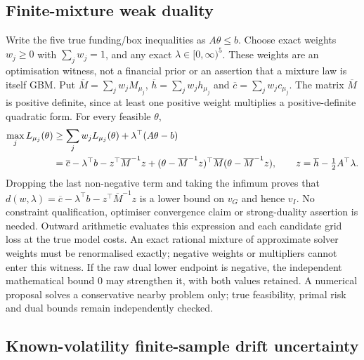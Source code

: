\documentclass[11pt]{article}
\begin{document}
\subsection{Finite-mixture weak duality}

Write the five true funding/box inequalities as $A\theta\leq b$.
Choose exact weights $w_j\geq0$ with $\sum_jw_j=1$, and any exact
$\lambda\in[0,\infty)^5$. These weights are an optimisation witness,
not a financial prior or an assertion that a mixture law is itself GBM.
Put $\overline M=\sum_jw_jM_{\mu_j}$,
$\overline h=\sum_jw_jh_{\mu_j}$ and
$\overline c=\sum_jw_jc_{\mu_j}$. The matrix $\overline M$ is positive
definite, since at least one positive weight multiplies a positive-definite
quadratic form. For every feasible $\theta$,
\begin{align}
 \max_jL_{\mu_j}(\theta)
 &\geq\sum_jw_jL_{\mu_j}(\theta)
      +\lambda^\top(A\theta-b)\notag\\
 &=\overline c-\lambda^\top b
   -z^\top\overline M^{-1}z
   +(\theta-\overline M^{-1}z)^\top
      \overline M(\theta-\overline M^{-1}z),\qquad
 z=\overline h-\tfrac12A^\top\lambda.
 \label{eq:h-drift-mixture-dual}
\end{align}
Dropping the last non-negative term and taking the infimum proves that
$d(w,\lambda)=\overline c-\lambda^\top b-z^\top\overline M^{-1}z$
is a lower bound on $v_G$ and hence $v_I$. No constraint qualification,
optimiser convergence claim or strong-duality assertion is needed.
Outward arithmetic evaluates this expression and each candidate grid loss
at the true model costs. An exact rational mixture of approximate solver
weights must be renormalised exactly; negative weights or multipliers
cannot enter this witness. If the raw dual lower endpoint is negative,
the independent mathematical bound $0$ may strengthen it, with both
values retained. A numerical proposal solves a conservative nearby problem
only; true feasibility, primal risk and dual bounds remain independently
checked.

\subsection{Known-volatility finite-sample drift uncertainty}
\end{document}
